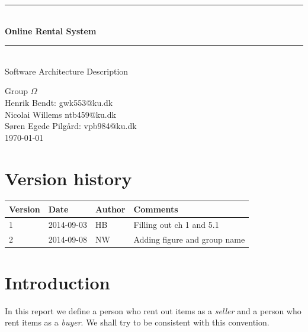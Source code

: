 \documentclass[a4paper,11pt]{report}
\makeatletter
\newcommand{\systemname}{Online Rental System}
\newcommand{\groupname}{Group $\Omega$}
\newcommand{\contactdetails}{Henrik Bendt: gwk553@ku.dk\\Nicolai Willems ntb459@ku.dk\\Søren Egede Pilgård: vpb984@ku.dk}
\makeatother
\begin{document}
%
%
\newcommand{\HRule}{\rule{\linewidth}{0.5mm}}
\begin{titlepage}

  \begin{center}

    \vspace*{4cm}
    \HRule \\[0.4cm]
    { \huge \bfseries \systemname}\\[0.4cm]
    \HRule \\[1.5cm]

    {\Large Software Architecture Description}

    \vfill
  \end{center}

  \begin{flushleft}
    {\LARGE \groupname}\\[0.2cm]
    {\large \contactdetails}\\[0.2cm]
   {\large \today}
  \end{flushleft}
\end{titlepage}

%
%
\newpage
\chapter*{Version history}

\begin{center}
  \begin{tabular}[h!]{| l | l | l | p{8 cm} |}
    \hline
    \rowcolor{gray}
    Version & Date & Author & Comments \\
    \hline
    \hline
    1 & 2014-09-03 & HB & Filling out ch 1 and 5.1\\
    \hline
    2 & 2014-09-08 & NW & Adding figure and group name \\
    \hline
  \end{tabular}
\end{center}

%
%
\setcounter{tocdepth}{1}
\tableofcontents

%
%
\chapter{Introduction}
\label{cha:introduction}
\thispagestyle{fancy}

In this report we define a person who rent out items as a \textit{seller} and a person who rent items as a \textit{buyer}. We shall try to be consistent with this convention.
\end{document}
